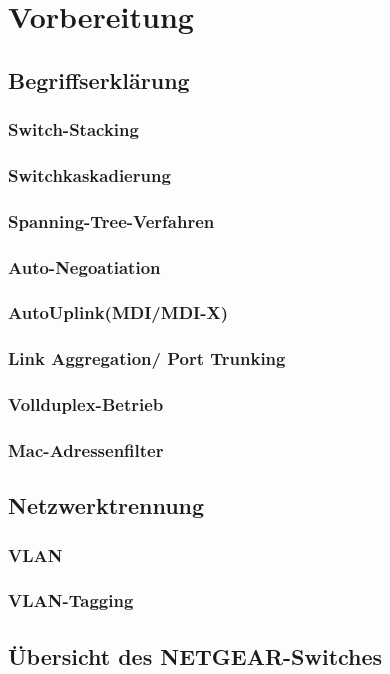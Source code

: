 \newpage
\section{Vorbereitung}

    \subsection{Begriffserklärung}

        \subsubsection{Switch-Stacking}

        \newpage
        \subsubsection{Switchkaskadierung}

        \newpage
        \subsubsection{Spanning-Tree-Verfahren}

        \newpage
        \subsubsection{Auto-Negoatiation}

        \newpage
        \subsubsection{AutoUplink(MDI/MDI-X)}

        \newpage
        \subsubsection{Link Aggregation/ Port Trunking}

        \newpage
        \subsubsection{Vollduplex-Betrieb}

        \newpage
        \subsubsection{Mac-Adressenfilter}

    \newpage
    \subsection{Netzwerktrennung}

        \subsubsection{VLAN}

        \newpage
        \subsubsection{VLAN-Tagging}

    \newpage
    \subsection{Übersicht des NETGEAR-Switches}